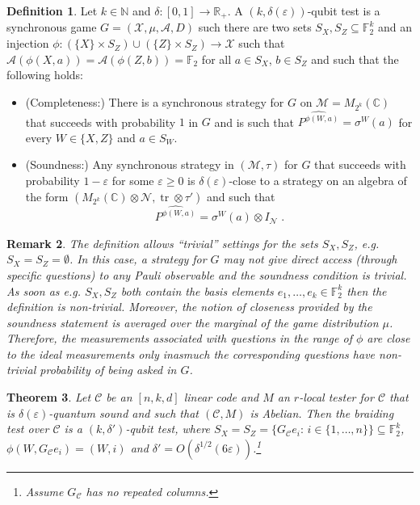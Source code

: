\documentclass[11pt]{article}
\newtheorem{theorem}{Theorem}[section]
\newtheorem{remark}[theorem]{Remark}
\theoremstyle{definition}
\newtheorem{definition}[theorem]{Definition}
\newcommand{\code}{\mathcal{C}}
\newcommand{\Id}{\ensuremath{I}}
\newcommand{\field}{\mathbb{F}_2}
\newcommand{\C}{\ensuremath{\mathbb{C}}}
\newcommand{\N}{\ensuremath{\mathbb{N}}}
\newcommand{\R}{\ensuremath{\mathbb{R}}}
\newcommand{\mA}{\ensuremath{\mathcal{A}}}
\newcommand{\mM}{\ensuremath{\mathcal{M}}}
\newcommand{\mX}{\ensuremath{\mathcal{X}}}
\newcommand{\eps}{\varepsilon}
\newcommand{\mN}{\mathcal{N}}
\DeclareMathOperator{\tr}{tr}
\begin{document}
\begin{definition}
Let $k\in \N$ and $\delta:[0,1]\to\R_+$. 
A $(k,\delta(\eps))$-qubit test is a synchronous game $G=(\mX,\mu,\mA,D)$ such there are two sets $S_X,S_Z\subseteq \field^k$ and an injection $\phi:(\{X\}\times S_Z) \cup (\{Z\}\times S_Z) \to \mX$ such that $\mA(\phi({X},a))=\mA(\phi({Z},b))=\field$ for all $a\in S_X$, $b\in S_Z$ and such that the following holds:
\begin{itemize}
\item (Completeness:) There is a synchronous strategy for $G$ on $\mM=M_{2^{k}}(\C)$ that succeeds with probability $1$ in $G$ and is such that $\widehat{P^{\phi({W},a)}} = \sigma^W(a)$  for every $W\in\{X,Z\}$ and $a\in S_W$.
\item (Soundness:) Any synchronous strategy in $(\mM,\tau)$ for $G$ that succeeds with probability $1-\eps$ for some $\eps\geq 0$ is $\delta(\eps)$-close to a strategy on an algebra of the form $(M_{2^{k}}(\C)\otimes \mN,\tr\otimes \tau')$ and such that
\[\widehat{P^{\phi({W},a)}} = \sigma^W(a)\otimes \Id_\mN\;.\]
\end{itemize}
\end{definition}

\begin{remark}
The definition allows ``trivial'' settings for the sets $S_X,S_Z$, e.g.\ $S_X=S_Z=\emptyset$. In this case, a strategy for $G$ may not give direct access (through specific questions) to any Pauli observable and the soundness condition is trivial. As soon as e.g. $S_X,S_Z$ both contain the basis elements $e_1,\ldots,e_k \in \field^k$ then the definition is non-trivial. Moreover, the notion of closeness provided by the soundness statement is averaged over the marginal of the game distribution $\mu$. Therefore, the measurements associated with questions in the range of $\phi$ are close to the ideal measurements only inasmuch the corresponding questions have non-trivial probability of being asked in $G$. 
\end{remark}

\begin{theorem}\label{thm:main}
Let $\code$ be an $[n,k,d]$ linear code and $M$ an $r$-local tester for $\code$ that is $\delta(\eps)$-quantum sound and such that $(\code,M)$ is Abelian. Then the braiding test over $\code$ is a $(k,\delta')$-qubit test, where $S_X=S_Z=\{G_\code e_i:\,i\in\{1,\ldots,n\}\}\subseteq \field^k$, $\phi(W,G_\code e_i)=(W,i)$ and $\delta' = O(\delta^{1/2}(6\eps))$.\footnote{Assume $G_\code$ has no repeated columns.} 
\end{theorem}
\end{document}
